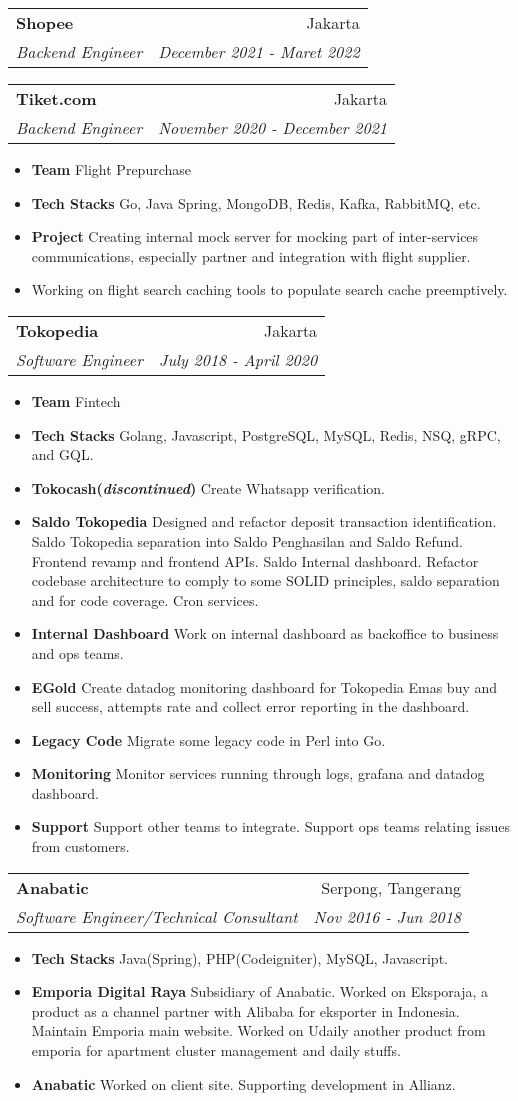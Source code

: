 \documentclass[letterpaper,11pt]{article}
\makeatletter
\newcommand{\resumeItem}[2]{
  \item\small{
    \textbf{#1}{ #2 \vspace{-2pt}}
  }
}
\newcommand{\resumeText}[1]{
  \item\small{
    \textrm{#1}
  }
}
\newcommand{\resumeSubheading}[4]{
  \vspace{-1pt}\item
    \begin{tabular*}{0.97\textwidth}[t]{l@{\extracolsep{\fill}}r}
      \textbf{#1} & #2 \\
      \textit{\small#3} & \textit{\small #4} \\
    \end{tabular*}\vspace{-5pt}
}
\newcommand{\resumeItemListStart}{\begin{itemize}}
\newcommand{\resumeItemListEnd}{\end{itemize}\vspace{-5pt}}
\makeatother
\begin{document}
    \resumeSubheading
    {Shopee}{Jakarta}
    {Backend Engineer}{December 2021 - Maret 2022}

    \resumeSubheading
      {Tiket.com}{Jakarta}
      {Backend Engineer}{November 2020 - December 2021}
      \resumeItemListStart
        \resumeItem{Team}
          {Flight Prepurchase}
        \resumeItem{Tech Stacks}
          {Go, Java Spring, MongoDB, Redis, Kafka, RabbitMQ, etc.}
        \resumeItem{Project}
          {Creating internal mock server for mocking part of inter-services communications, especially partner and integration with flight supplier.}
        \resumeText
          {Working on flight search caching tools to populate search cache preemptively.}
      \resumeItemListEnd

    \resumeSubheading
      {Tokopedia}{Jakarta}
      {Software Engineer}{July 2018 - April 2020}
      \resumeItemListStart
        \resumeItem{Team}{Fintech}
        \resumeItem{Tech Stacks}
          {Golang, Javascript, PostgreSQL, MySQL, Redis, NSQ, gRPC, and GQL.}
        \resumeItem{Tokocash(\emph{discontinued})}
          {Create Whatsapp verification.}
        \resumeItem{Saldo Tokopedia}
          {Designed and refactor deposit transaction identification. Saldo Tokopedia separation into Saldo Penghasilan and Saldo Refund. Frontend revamp and frontend APIs. Saldo Internal dashboard. Refactor codebase architecture to comply to some SOLID principles, saldo separation and for code coverage. Cron services.}
        \resumeItem{Internal Dashboard}
          {Work on internal dashboard as backoffice to business and ops teams.}
        \resumeItem{EGold}
          {Create  datadog monitoring dashboard for Tokopedia Emas buy and sell success, attempts rate and collect error reporting in the dashboard.}
        \resumeItem{Legacy Code}
          {Migrate some legacy code in Perl into Go.}
        \resumeItem{Monitoring}
          {Monitor services running through logs, grafana and datadog dashboard.}
        \resumeItem{Support}
          {Support other teams to integrate. Support ops teams relating issues from customers.}
      \resumeItemListEnd

    \resumeSubheading
      {Anabatic}{Serpong, Tangerang}
      {Software Engineer/Technical Consultant}{Nov 2016 - Jun 2018}
      \resumeItemListStart
        \resumeItem{Tech Stacks}
          {Java(Spring), PHP(Codeigniter), MySQL, Javascript.}
        \resumeItem{Emporia Digital Raya}
          {Subsidiary of Anabatic. Worked on Eksporaja, a product as a channel partner with Alibaba for eksporter in Indonesia. Maintain Emporia main website. Worked on Udaily another product from emporia for apartment cluster management and daily stuffs.}
        \resumeItem{Anabatic}
          {Worked on client site. Supporting development in Allianz.}
      \resumeItemListEnd
\end{document}
